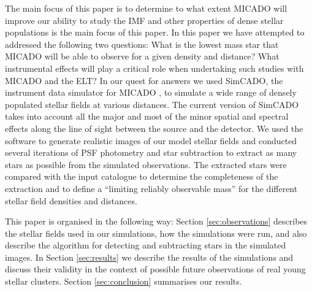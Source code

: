 The main focus of this paper is to determine to what extent MICADO will improve our ability to study the IMF and other properties of dense stellar populations is the main focus of this paper. 
In this paper we have attempted to addressed the following two questions: What is the lowest mass star that MICADO will be able to observe for a given density and distance?
What instrumental effects will play a critical role when undertaking such studies with MICADO and the ELT?
In our quest for answers we used SimCADO, the instrument data simulator for MICADO \citep{leschinski2016}, to simulate a wide range of densely populated stellar fields at various distances. 
The current version of SimCADO takes into account all the major and most of the minor spatial and spectral effects along the line of sight between the source and the detector. 
We used the software to generate realistic images of our model stellar fields and  conducted several iterations of PSF photometry and star subtraction to extract as many stars as possible from the simulated observations. 
The extracted stars were compared with the input catalogue to determine the completeness of the extraction and to define a ``limiting reliably observable mass'' for the different stellar field densities and distances.

This paper is organised in the following way: Section \ref{sec:observations} describes the stellar fields used in our simulations, how the simulations were run, and also describe the algorithm for detecting and subtracting stars in the simulated images. 
In Section \ref{sec:results} we describe the results of the simulations and discuss their validity in the context of possible future observations of real young stellar clusters. 
Section \ref{sec:conclusion} summarises our results.
